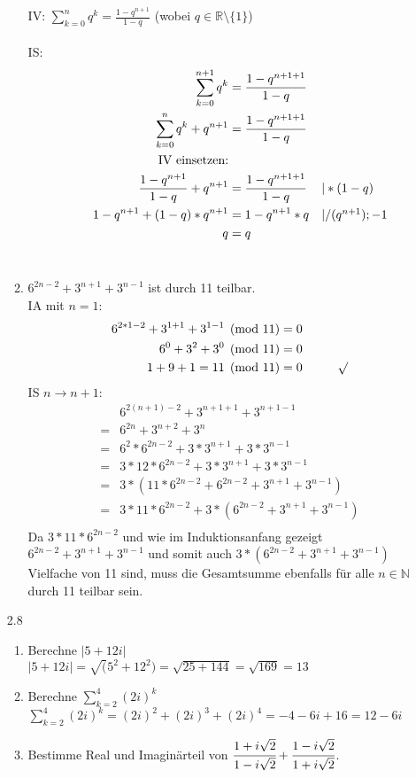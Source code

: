 \documentclass[12pt,letterpaper]{article}
\newcommand{\alignleft}[1]{\tag*{\llap{\makebox[\linewidth][l]{$#1$}}}}
\newcommand{\LLeftrightarrow}{ \alignleft{\Leftrightarrow}}
\newcommand{\eqinfo}[1]{&\makebox[2cm][l]{$\vert #1$}}
\newcommand{\Eqn}[3]{#1 &#2 #3}
\newcommand{\eqnf}[2]{\Eqn{#1}{=}{#2}\\}
\newcommand{\eqn}[2]{\LLeftrightarrow\Eqn{#1}{=}{#2}\\}
\newcommand{\eqni}[3]{\LLeftrightarrow\Eqn{#1}{=}{#2}\eqinfo{#3}\\}
\begin{document}
\begin{enumerate}
\begin{enumerate}
IV: $\sum\limits_{k=0}^{n}q^k = \frac{1-q^{n+1}}{1-q}$ (wobei $q\in\mathbb{R}\setminus\{1\}$)\\
\\
IS:\\
\begin{align*}
	\eqnf{\sum_{k=0}^{n+1}q^k}{\frac{1-q^{n+1+1}}{1-q}}
	\eqn{\sum_{k=0}^{n}q^k+q^{n+1}}{\frac{1-q^{n+1+1}}{1-q}}
	\text{IV einsetzen:}\\
	\eqni{\frac{1-q^{n+1}}{1-q}+q^{n+1}}{\frac{1-q^{n+1+1}}{1-q}}{*(1-q)}
	\eqni{1-q^{n+1}+(1-q)*q^{n+1}}{1-q^{n+1}*q}{/(q^{n+1});-1}
	\eqn{q}{q}	
\end{align*}
\\
\item $6^{2n-2}+3^{n+1}+3^{n-1}$ ist durch 11 teilbar.\\
IA mit $n=1$: 
\begin{align*}
\eqnf{6^{2*1-2}+3^{1+1}+3^{1-1} \pmod{11}}{0}
\eqn{6^0+3^2+3^0 \pmod{11}}{0}
\eqn{1+9+1 = 11 \pmod{11}}{0\makebox[1cm]{}\surd}
\end{align*}
IS $n\to n+1$:
\begin{align*}
&6^{2(n+1)-2}+3^{n+1+1}+3^{n+1-1}\\
= &6^{2n}+3^{n+2}+3^{n}\\
= &6^2*6^{2n-2}+3*3^{n+1}+3*3^{n-1}\\ 
= &3*12*6^{2n-2}+3*3^{n+1}+3*3^{n-1}\\
= &3*(11*6^{2n-2}+6^{2n-2}+3^{n+1}+3^{n-1})\\
= &3*11*6^{2n-2}+ 3*(6^{2n-2}+3^{n+1}+3^{n-1})\\
\end{align*}
Da $3*11*6^{2n-2}$ und wie im Induktionsanfang gezeigt $6^{2n-2}+3^{n+1}+3^{n-1}$ und somit auch $3*(6^{2n-2}+3^{n+1}+3^{n-1})$ Vielfache von 11 sind, muss die Gesamtsumme ebenfalls für alle $n\in\mathbb{N}$ durch 11 teilbar sein.
\end{enumerate}
\item [2.8]
\begin{enumerate}
\item Berechne $|5+12i|$\\
$|5+12i| = \sqrt(5^2+12^2) = \sqrt{25+144} = \sqrt{169} = 13$
\item Berechne $\sum\limits_{k=2}^{4}(2i)^k$\\
$\sum\limits_{k=2}^{4}(2i)^k = (2i)^2+(2i)^3+(2i)^4 = -4-6i+16 = 12-6i$
\item Bestimme Real und Imaginärteil von $\cfrac{1+i\sqrt{2}}{1-i\sqrt{2}}+\cfrac{1-i\sqrt{2}}{1+i\sqrt{2}}$.\\

\end{enumerate}
\end{enumerate}
\end{document}

